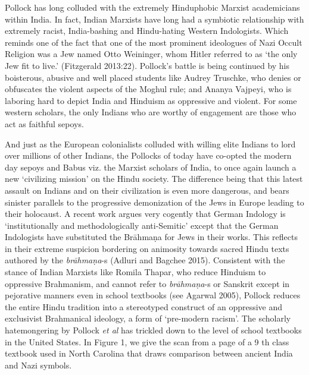 Pollock has long colluded with the extremely Hinduphobic Marxist academicians within India. In fact, Indian Marxists have long had a symbiotic relationship with extremely racist, India-bashing and Hindu-hating Western Indologists. Which reminds one of the fact that one of the most prominent ideologues of Nazi Occult Religion was a Jew named Otto Weininger, whom Hitler referred to as ‘the only Jew fit to live.’ (Fitzgerald 2013:22). Pollock’s battle is being continued by his boisterous, abusive and well placed students like Audrey Truschke, who denies or obfuscates the violent aspects of the Moghul rule; and Ananya Vajpeyi, who is laboring hard to depict India and Hinduism as oppressive and violent. For some western scholars, the only Indians who are worthy of engagement are those who act as faithful sepoys.

And just as the European colonialists colluded with willing elite Indians to lord over millions of other Indians, the Pollocks of today have co-opted the modern day sepoys and Babus viz. the Marxist scholars of India, to once again launch a new ‘civilizing mission’ on the Hindu society. The difference being that this latest assault on Indians and on their civilization is even more dangerous, and bears sinister parallels to the progressive demonization of the Jews in Europe leading to their holocaust. A recent work argues very cogently that German Indology is ‘institutionally and methodologically anti-Semitic’ except that the German Indologists have substituted the Brāhmaṇa for Jews in their works. This reflects in their extreme suspicion bordering on animosity towards sacred Hindu texts authored by the \textit{brāhmaṇa}-s (Adluri and Bagchee 2015). Consistent with the stance of Indian Marxists like Romila Thapar, who reduce Hinduism to oppressive Brahmanism, and cannot refer to \textit{brāhmaṇa}-s or Sanskrit except in pejorative manners even in school textbooks (see Agarwal 2005), Pollock reduces the entire Hindu tradition into a stereotyped construct of an oppressive and exclusivist Brahmanical ideology, a form of ‘pre-modern racism’. The scholarly hatemongering by Pollock \textit{et al} has trickled down to the level of school textbooks in the United States. In Figure 1, we give the scan from a page of a 9 th class textbook used in North Carolina that draws comparison between ancient India and Nazi symbols.

